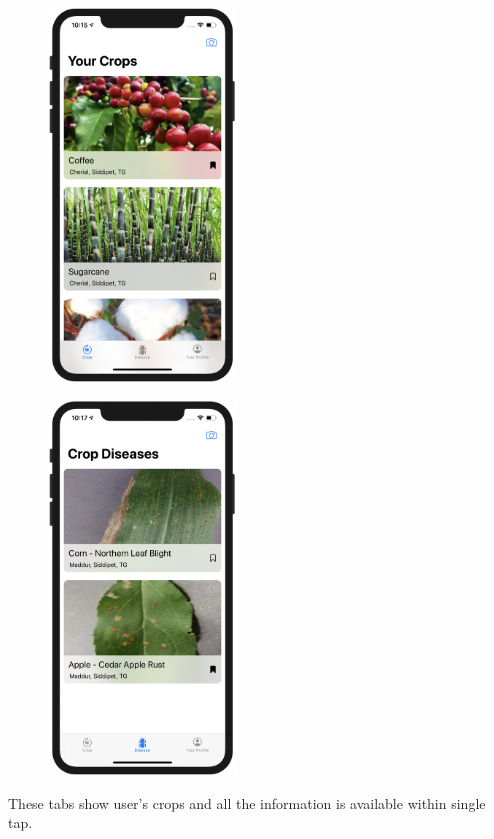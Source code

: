 \documentclass[../Report.tex]{subfiles}
\begin{document}
\begin{figure}[H]
    \centering
    \begin{minipage}{.5\textwidth}
      \centering
      \includegraphics[width=5cm]{images/crop.png}
      \label{fig:ss_crop}
    \end{minipage}%
    \begin{minipage}{.5\textwidth}
      \centering
      \includegraphics[width=5cm]{images/disease.png}
      \label{fig:ss_disease}
    \end{minipage}
\end{figure}

These tabs show user's crops and all the information is available within single tap.
\end{document}
